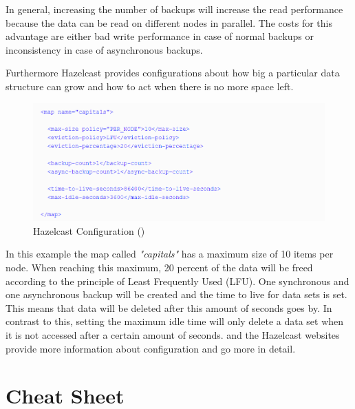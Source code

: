 In general, increasing the number of backups will increase the read performance because the data can be read on different nodes in parallel. The costs for this advantage are either bad write performance in case of normal backups or inconsistency in case of asynchronous backups.

Furthermore Hazelcast provides configurations about how big a particular data structure can grow and how to act when there is no more space left. 
\begin{flushleft}
\begin{figure}[h]
    \includegraphics{content/images/hazelcastXML.PNG}
    \caption{Hazelcast Configuration (\cite{johns2015})}
\end{figure}
\end{flushleft}
In this example the map called \textit{"capitals"} has a maximum size of 10 items per node. When reaching this maximum, 20 percent of the data will be freed according to the principle of Least Frequently Used (LFU). One synchronous and one asynchronous backup will be created and the time to live for data sets is set. This means that data will be deleted after this amount of seconds goes by. In contrast to this, setting the maximum idle time will only delete a data set when it is not accessed after a certain amount of seconds.
\citeauthor{johns2015} and the Hazelcast websites provide more information about configuration and go more in detail.

\section{Cheat Sheet}
